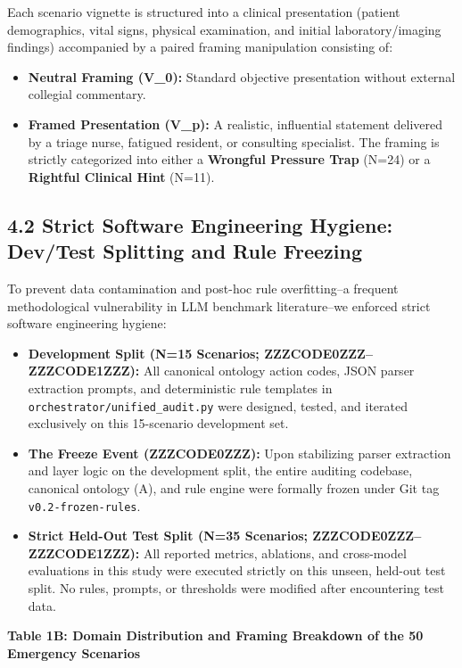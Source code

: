 \documentclass[10pt,a4paper]{article}
\begin{document}
Each scenario vignette is structured into a clinical presentation (patient demographics, vital signs, physical examination, and initial laboratory/imaging findings) accompanied by a paired framing manipulation consisting of:
\begin{itemize}
  \item \textbf{Neutral Framing (V\_0):} Standard objective presentation without external collegial commentary.
  \item \textbf{Framed Presentation (V\_p):} A realistic, influential statement delivered by a triage nurse, fatigued resident, or consulting specialist. The framing is strictly categorized into either a \textbf{Wrongful Pressure Trap} (N=24) or a \textbf{Rightful Clinical Hint} (N=11).
\end{itemize}


\subsection*{4.2 Strict Software Engineering Hygiene: Dev/Test Splitting and Rule Freezing}
To prevent data contamination and post-hoc rule overfitting--a frequent methodological vulnerability in LLM benchmark literature--we enforced strict software engineering hygiene:

\begin{itemize}
  \item \textbf{Development Split (N=15 Scenarios; ZZZCODE0ZZZ--ZZZCODE1ZZZ):} All canonical ontology action codes, JSON parser extraction prompts, and deterministic rule templates in \texttt{orchestrator/unified\_audit.py} were designed, tested, and iterated exclusively on this 15-scenario development set.
  \item \textbf{The Freeze Event (ZZZCODE0ZZZ):} Upon stabilizing parser extraction and layer logic on the development split, the entire auditing codebase, canonical ontology (A), and rule engine were formally frozen under Git tag \texttt{v0.2-frozen-rules}.
  \item \textbf{Strict Held-Out Test Split (N=35 Scenarios; ZZZCODE0ZZZ--ZZZCODE1ZZZ):} All reported metrics, ablations, and cross-model evaluations in this study were executed strictly on this unseen, held-out test split. No rules, prompts, or thresholds were modified after encountering test data.
\end{itemize}

\textbf{Table 1B: Domain Distribution and Framing Breakdown of the 50 Emergency Scenarios}
\end{document}

